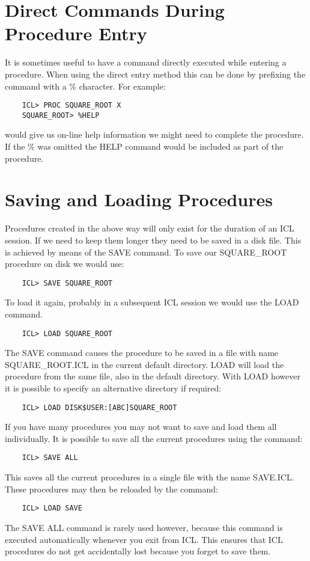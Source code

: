 \documentclass[twoside,11pt]{report}
\newcommand{\xlabel}[1]{}
\begin{document}
\section{\xlabel{direct_commands_during_procedure_entry}Direct Commands During Procedure Entry}
It is sometimes useful to have a command directly executed while entering
a procedure. When using the direct entry method this can be done by
prefixing the command with a \% character. For example:
\begin{verbatim}
    ICL> PROC SQUARE_ROOT X
    SQUARE_ROOT> %HELP
\end{verbatim}
would give us on-line help information we might need to complete the
procedure. If the \% was omitted the HELP command would be included as
part of the procedure.
\section{\xlabel{saving_and_loading_procedures}Saving and Loading Procedures}
Procedures created in the above way will only exist for the duration of
an ICL session. If we need to keep them longer they need to be saved in
a disk file. This is achieved by means of the SAVE command. To save our
SQUARE\_ROOT procedure on disk we would use:
\begin{verbatim}
    ICL> SAVE SQUARE_ROOT
\end{verbatim}
To load it again, probably in a subsequent ICL session we would use
the LOAD command.
\begin{verbatim}
    ICL> LOAD SQUARE_ROOT
\end{verbatim}
The SAVE command causes the procedure to be saved in a file with
name SQUARE\_ROOT.ICL in the current default directory. LOAD will load
the procedure from the same file, also in the default directory. With
LOAD however it is possible to specify an alternative directory if
required:
\begin{verbatim}
    ICL> LOAD DISK$USER:[ABC]SQUARE_ROOT
\end{verbatim}
If you have many procedures you may not want to save and load them all
individually. It is possible to save all the current procedures using
the command:
\begin{verbatim}
    ICL> SAVE ALL
\end{verbatim}
This saves all the current procedures in a single file with the name SAVE.ICL.
These procedures may then be reloaded by the command:
\begin{verbatim}
    ICL> LOAD SAVE
\end{verbatim}
The SAVE ALL command is rarely used however, because this command is
executed automatically whenever you exit from ICL. This ensures that ICL
procedures do not get accidentally lost because you forget to save them.
\end{document}

